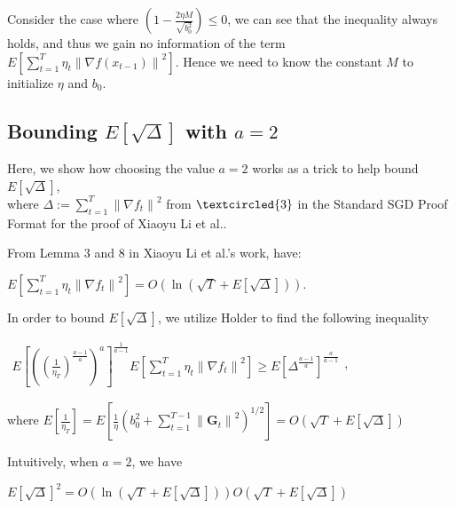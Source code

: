 \documentclass[14pt,onecolumn,letterpaper]{extarticle}
\begin{document}
Consider the case where $\left(1-\frac{2 \eta M}{\sqrt{b_0^2}}\right) \leq 0$, we can see that the inequality always holds, and thus we gain no information of the term $E\left[\sum_{t=1}^T \eta_t\left\|\nabla f\left(x_{t-1}\right)\right\|^2\right]$. Hence we need to know the constant $M$ to initialize $\eta$ and $b_0$.

\subsection{Bounding $E\left[\sqrt{\Delta}\right]$ with $a = 2$}
Here, we show how choosing the value $a = 2$ works as a trick to help bound $E\left[\sqrt{\Delta}\right]$,\\ where $\Delta:=\sum_{t=1}^T\left\|\nabla f_t\right\|^2$ from $\textcircled{3}$ in the Standard SGD Proof Format for the proof of Xiaoyu Li et al.. \par
From Lemma 3 and 8 in Xiaoyu Li et al.'s work, have:
\par\vspace{3mm}
$E\left[\sum_{t=1}^T \eta_t\left\|\nabla f_t\right\|^2\right] = O\left( \ln \left(\sqrt{T}+ E\left[\sqrt{\Delta}\right]\right)\right).$
\par\vspace{3mm}
In order to bound $E\left[\sqrt{\Delta}\right]$,  we utilize Holder to find the following inequality
\par\vspace{3mm}
$\begin{aligned} E\left[\left(\left(\frac{1}{\eta_T}\right)^{\frac{a-1}{a}}\right)^{a}\right]^{\frac{1}{a-1}}E\left[\sum_{t=1}^T \eta_t\left\|\nabla f_t\right\|^2\right] \geq E\left[\Delta^{\frac{a-1}{a}}\right]^{\frac{a}{a-1}}\end{aligned}$, 
\par\vspace{3mm}
where
$E\left[\frac{1}{\eta_T}\right]=E\left[\frac{1}{\eta}\left(b_0^2+\sum_{t=1}^{T-1}\left\|\boldsymbol{G}_t \right\|^2\right)^{1 / 2}\right] = O\left(\sqrt{T}+ E\left[\sqrt{\Delta}\right]\right)$
\par\vspace{3mm}
Intuitively, when $a = 2$, we have \par\vspace{3mm}
$E\left[\sqrt{\Delta}\right]^{2} = O\left( \ln \left(\sqrt{T}+ E\left[\sqrt{\Delta}\right]\right)\right)O\left(\sqrt{T}+ E\left[\sqrt{\Delta}\right]\right)$
\par\vspace{3mm}
\end{document}
